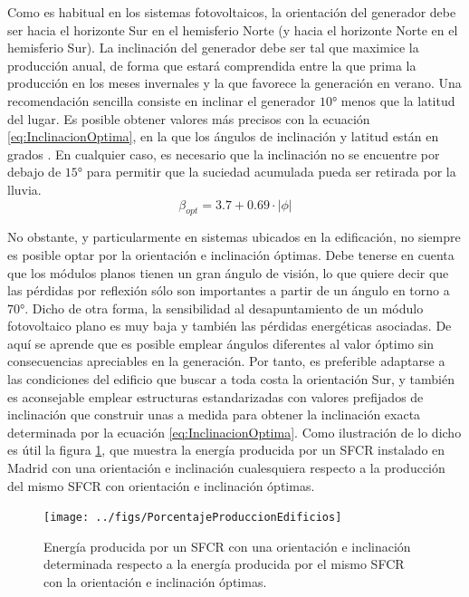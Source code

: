 Como es habitual en los sistemas fotovoltaicos, la orientación del
generador debe ser hacia el horizonte Sur en el hemisferio Norte (y
hacia el horizonte Norte en el hemisferio Sur). La inclinación del
generador debe ser tal que maximice la producción anual, de forma
que estará comprendida entre la que prima la producción en los meses
invernales y la que favorece la generación en verano. Una recomendación
sencilla consiste en inclinar el generador $\ang{10}$ menos que
la latitud del lugar. Es posible obtener valores más precisos con
la ecuación \ref{eq:InclinacionOptima}, en la que los ángulos de
inclinación y latitud están en grados \cite{Lorenzo2006c}. En cualquier
caso, es necesario que la inclinación no se encuentre por debajo de
$\ang{15}$ para permitir que la suciedad acumulada pueda ser retirada
por la lluvia.\begin{equation}
\beta_{opt}=3.7+0.69\cdot|\phi|\label{eq:InclinacionOptima}\end{equation}


No obstante, y particularmente en sistemas ubicados en la edificación,
no siempre es posible optar por la orientación e inclinación óptimas.
Debe tenerse en cuenta que los módulos planos tienen un gran ángulo
de visión, lo que quiere decir que las pérdidas por reflexión sólo
son importantes a partir de un ángulo en torno a $\ang{70}$. Dicho
de otra forma, la sensibilidad al desapuntamiento de un módulo fotovoltaico
plano es muy baja y también las pérdidas energéticas asociadas. De
aquí se aprende que es posible emplear ángulos diferentes al valor
óptimo sin consecuencias apreciables en la generación. Por tanto,
es preferible adaptarse a las condiciones del edificio que buscar
a toda costa la orientación Sur, y también es aconsejable emplear
estructuras estandarizadas con valores prefijados de inclinación que
construir unas a medida para obtener la inclinación exacta determinada
por la ecuación \ref{eq:InclinacionOptima}. Como ilustración de lo
dicho es útil la figura \ref{fig:EnergiaOrientacionInclinacion},
que muestra la energía producida por un SFCR instalado en Madrid con
una orientación e inclinación cualesquiera respecto a la producción
del mismo SFCR con orientación e inclinación óptimas.

%
\begin{figure}


\texttt{[image: ../figs/PorcentajeProduccionEdificios]}

\caption{Energía producida por un SFCR con una orientación e inclinación determinada
respecto a la energía producida por el mismo SFCR con la orientación
e inclinación óptimas.\label{fig:EnergiaOrientacionInclinacion}}



\end{figure}


